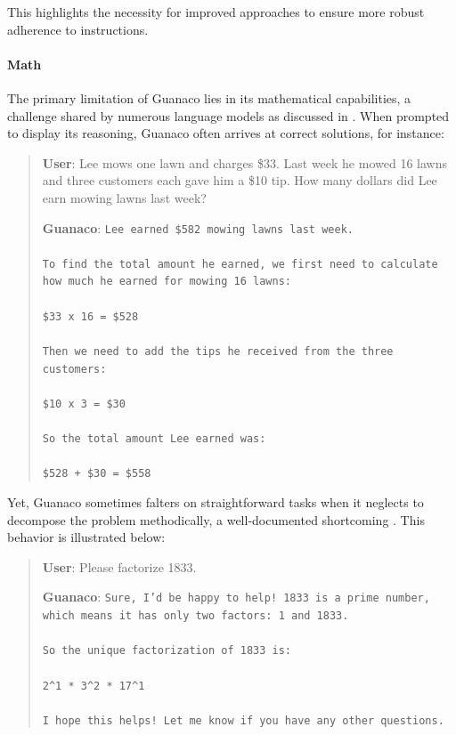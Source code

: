 This highlights the necessity for improved approaches to ensure more robust adherence to instructions.

\paragraph{Math} The primary limitation of {Guanaco} lies in its mathematical capabilities, a challenge shared by numerous language models as discussed in \citep{liang2022holistic}. When prompted to display its reasoning, {Guanaco} often arrives at correct solutions, for instance:

\begin{quote}
    \textbf{User}: Lee mows one lawn and charges \$33. Last week he mowed 16 lawns and three customers each gave him a \$10 tip. How many dollars did Lee earn mowing lawns last week?

    \textbf{Guanaco}: \texttt{Lee earned \$582 mowing lawns last week. \\ \\ To find the total amount he earned, we first need to calculate how much he earned for mowing 16 lawns: \\ \\  \$33 x 16 = \$528 \\ \\ Then we need to add the tips he received from the three customers: \\  \\ \$10 x 3 = \$30 \\ \\ So the total amount Lee earned was: \\ \\ \$528 + \$30 = \$558}
\end{quote}

Yet, {Guanaco} sometimes falters on straightforward tasks when it neglects to decompose the problem methodically, a well-documented shortcoming \cite{weichain}. This behavior is illustrated below:

\begin{quote}
    \textbf{User}: Please factorize 1833.

    \textbf{Guanaco}: \texttt{Sure, I'd be happy to help! 1833 is a prime number, which means it has only two factors: 1 and 1833. \\ \\ So the unique factorization of 1833 is: \\ \\ 2\^{}1 * 3\^{}2 * 17\^{}1 \\ \\ I hope this helps! Let me know if you have any other questions.}
\end{quote}

